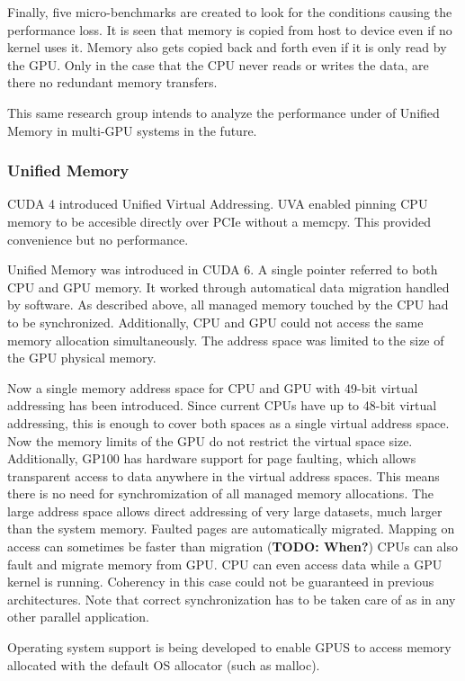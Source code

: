 Finally, five micro-benchmarks are created to look for the conditions causing the performance loss.
It is seen that memory is copied from host to device even if no kernel uses it.
Memory also gets copied back and forth even if it is only read by the GPU.
Only in the case that the CPU never reads or writes the data, are there no redundant memory transfers.

This same research group intends to analyze the performance under of Unified Memory in multi-GPU systems in the future.

\subsubsection{Unified Memory}
CUDA 4 introduced Unified Virtual Addressing.
UVA enabled pinning CPU memory to be accesible directly over PCIe without a memcpy.
This provided convenience but no performance.

Unified Memory was introduced in CUDA 6.
A single pointer referred to both CPU and GPU memory.
It worked through automatical data migration handled by software.
As described above, all managed memory touched by the CPU had to be synchronized.
Additionally, CPU and GPU could not access the same memory allocation simultaneously.
The address space was limited to the size of the GPU physical memory.

Now a single memory address space for CPU and GPU with 49-bit virtual addressing has been introduced.
Since current CPUs have up to 48-bit virtual addressing, this is enough to cover both spaces as a single virtual address space.
Now the memory limits of the GPU do not restrict the virtual space size.
Additionally, GP100 has hardware support for page faulting, which allows transparent access to data anywhere in the virtual address spaces.
This means there is no need for synchromization of all managed memory allocations.
The large address space allows direct addressing of very large datasets, much larger than the system memory.
Faulted pages are automatically migrated.
Mapping on access can sometimes be faster than migration (\textbf{TODO: When?})
CPUs can also fault and migrate memory from GPU.
CPU can even access data while a GPU kernel is running.
Coherency in this case could not be guaranteed in previous architectures.
Note that correct synchronization has to be taken care of as in any other parallel application.

Operating system support is being developed to enable GPUS to access memory allocated with the default OS allocator (such as malloc).

